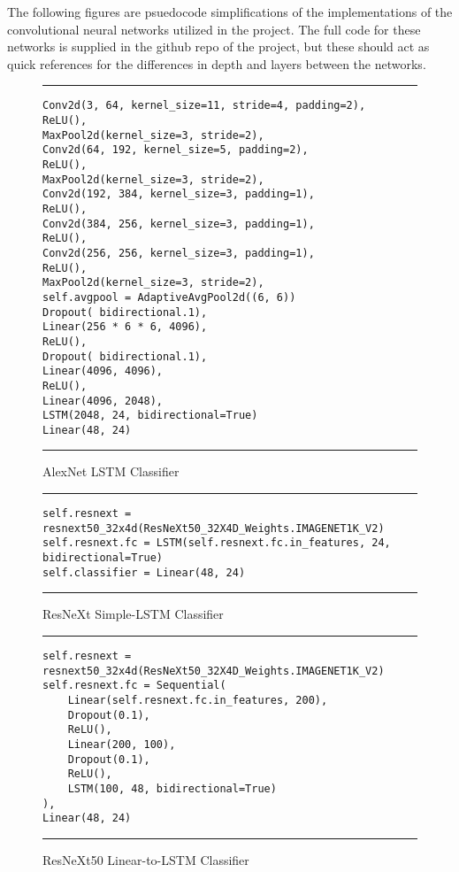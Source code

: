 The following figures are psuedocode simplifications of the implementations of the convolutional neural networks utilized in the project. The full code for these networks is supplied in the github repo \cite{Git} of the project, but these should act as quick references for the differences in depth and layers between the networks.

\begin{figure}
  \caption{AlexNet LSTM Classifier}
  \label{fig:cnnAlexNetLSTM}
  \par\noindent\rule{\textwidth}{0.5pt}
  \begin{\codefigsize}
  \begin{lstlisting}
Conv2d(3, 64, kernel_size=11, stride=4, padding=2),
ReLU(),
MaxPool2d(kernel_size=3, stride=2),
Conv2d(64, 192, kernel_size=5, padding=2),
ReLU(),
MaxPool2d(kernel_size=3, stride=2),
Conv2d(192, 384, kernel_size=3, padding=1),
ReLU(),
Conv2d(384, 256, kernel_size=3, padding=1),
ReLU(),
Conv2d(256, 256, kernel_size=3, padding=1),
ReLU(),
MaxPool2d(kernel_size=3, stride=2),
self.avgpool = AdaptiveAvgPool2d((6, 6))
Dropout( bidirectional.1),
Linear(256 * 6 * 6, 4096),
ReLU(),
Dropout( bidirectional.1),
Linear(4096, 4096),
ReLU(),
Linear(4096, 2048),
LSTM(2048, 24, bidirectional=True)
Linear(48, 24)
  \end{lstlisting}
  \end{\codefigsize}
  \par\noindent\rule{\textwidth}{0.5pt}
\end{figure}

\begin{figure}
  \caption{ResNeXt Simple-LSTM Classifier}
  \label{fig:cnnResNeXt50SimpleLSTM}
  \par\noindent\rule{\textwidth}{0.5pt}
  \begin{\codefigsize}
  \begin{lstlisting}
self.resnext = resnext50_32x4d(ResNeXt50_32X4D_Weights.IMAGENET1K_V2)
self.resnext.fc = LSTM(self.resnext.fc.in_features, 24, bidirectional=True)
self.classifier = Linear(48, 24)
  \end{lstlisting}
  \end{\codefigsize}
  \par\noindent\rule{\textwidth}{0.5pt}
\end{figure}

\begin{figure}
  \caption{ResNeXt50 Linear-to-LSTM Classifier}
  \label{fig:cnnResNeXt50Linear2LSTM}
  \par\noindent\rule{\textwidth}{0.5pt}
  \begin{\codefigsize}
  \begin{lstlisting}
self.resnext = resnext50_32x4d(ResNeXt50_32X4D_Weights.IMAGENET1K_V2)
self.resnext.fc = Sequential(
    Linear(self.resnext.fc.in_features, 200),
    Dropout(0.1),
    ReLU(),
    Linear(200, 100),
    Dropout(0.1),
    ReLU(),
    LSTM(100, 48, bidirectional=True)
),
Linear(48, 24)
  \end{lstlisting}
  \end{\codefigsize}
  \par\noindent\rule{\textwidth}{0.5pt}
\end{figure}

